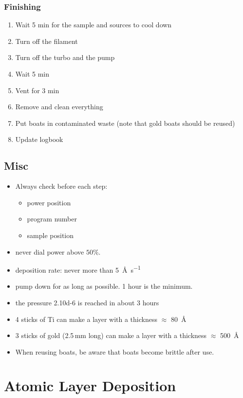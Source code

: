 \documentclass[12pt,a4paper]{report}
\begin{document}
\subsubsection{Finishing}
\begin{enumerate}[resume]
\item Wait 5 min for the sample and sources to cool down
\item Turn off the filament
\item Turn off the turbo and the pump
\item Wait 5 min
\item Vent for 3 min
\item Remove and clean everything
\item Put boats in contaminated waste (note that gold boats should be reused)
\item Update logbook
\end{enumerate}

\subsection{Misc}
\begin{itemize}
\item Always check before each step:
\begin{itemize}[noitemsep,nolistsep]
  \item power position
  \item program number
  \item sample position
\end{itemize}
\item never dial power above $50\%$.
\item deposition rate: never more than \SI{5}{\angstrom\per\second}
\item pump down for as long as possible. 1 hour is the minimum.
\item the pressure \SI{2.10d-6}{\torr} is reached in about 3 hours
\item 4 sticks of Ti can make a layer with a thickness $\approx$ \SI{80}{\angstrom}
\item 3 sticks of gold (2.5\,mm long) can make a layer with a thickness $\approx$ \SI{500}{\angstrom}
\item When reusing boats, be aware that boats become brittle after use.
\end{itemize}

\newpage

\section{Atomic Layer Deposition}
\end{document}
